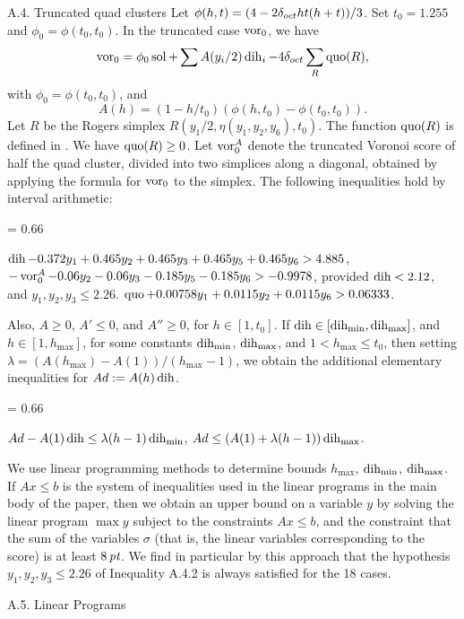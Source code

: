 \bigskip
\subhead A.4. Truncated quad clusters\endsubhead
Let $\phi(h,t) = (4 - 2\delta_{oct} h t (h + t))/3$.
Set $t_0=1.255$ and $\phi_0=\phi(t_0,t_0)$.
In the truncated case $\operatorname{vor}_0$, we have
$$\operatorname{vor}_0 = \phi_0\operatorname{sol} + \sum A(y_i/2)\operatorname{dih}_i - 4\delta_{oct}\sum_R\operatorname{quo}(R),$$
with
	$\phi_0 = \phi(t_0,t_0)$, and
$$A(h) = (1-h/t_0)(\phi(h,t_0)-\phi(t_0,t_0)).$$
Let $R$ be the Rogers simplex $R(y_1/2,\eta(y_1,y_2,y_6),t_0)$.
The function $\operatorname{quo}(R)$ is defined in \cite{F.3.3}.
We have $\operatorname{quo}(R)\ge0$.   Let $\operatorname{vor}_0^A$ denote the truncated Voronoi
score of half the quad cluster, divided into two simplices along
a diagonal, obtained by applying the formula
for $\operatorname{vor}_0$ to the simplex.
The following inequalities hold by interval arithmetic:

{
\baselineskip = 0.66\baselineskip
\obeylines
\parskip=0pt
 
\hbox{}

 $\dih-0.372 y_1 +0.465 y_2 +0.465 y_3 + 0.465 y_5 +0.465 y_6 %
	> 4.885$,
 $-\operatorname{vor}^A_0 - 0.06 y_2 -0.06 y_3 -0.185 y_5 -0.185 y_6 > -0.9978$,
	provided $\operatorname{dih}<2.12$, and $y_1,y_2,y_3\le 2.26$.
 $\operatorname{quo} + 0.00758 y_1 + 0.0115 y_2 + 0.0115 y_6 > 0.06333$.

}

Also, $A\ge0$, $A'\le0$, and $A''\ge0$, for $h\in[1,t_0]$. 
If $\operatorname{dih}\in[\operatorname{dih}_{\min},\operatorname{dih}_{\max}]$, and $h\in[1,h_{\max}]$,
for some constants $\operatorname{dih}_{\min}$, $\operatorname{dih}_{\max}$, and $1<h_{\max}\le t_0$,
then setting $\lambda = (A(h_{\max})-A(1))/(h_{\max}-1)$, we obtain
the additional elementary inequalities for $Ad := A(h)\operatorname{dih}$.


{
\baselineskip = 0.66\baselineskip
\obeylines
\parskip=0pt
 
\hbox{}
 $Ad - A(1)\operatorname{dih} \le \lambda (h-1) \operatorname{dih}_{\min}$,
 $Ad \le (A(1)+\lambda (h-1))\operatorname{dih}_{\max}$.


}

We use linear programming methods to determine bounds $h_{\max}$,
$\operatorname{dih}_{\min}$, $\operatorname{dih}_{\max}$.  If $A x\le b$ is the system of
inequalities used in the linear programs in the main body of the paper,
then we obtain an upper bound on a variable $y$ by solving the
linear program
$\max y$ subject to the constraints $A x\le b$, and the constraint
that the sum of the variables $\sigma$ (that is, the linear variables
corresponding to
the score) is at least $8\,\hbox{\it pt}$.  We find in particular by this
approach that the hypothesis $y_1,y_2,y_3\le 2.26$ of Inequality
A.4.2 is always satisfied for the 18 cases.

\bigskip
\subhead A.5. Linear Programs\endsubhead

